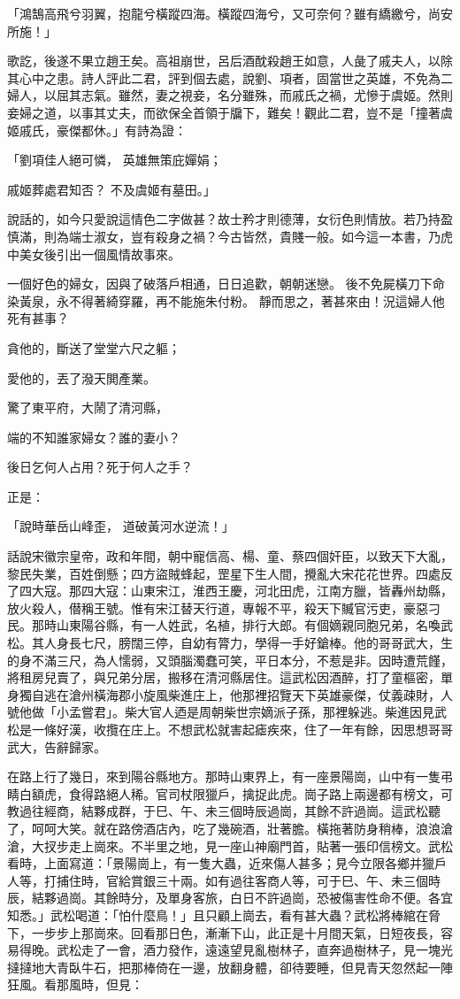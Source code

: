 「鴻鵠高飛兮羽翼，抱龍兮橫蹤四海。橫蹤四海兮，又可奈何？雖有繑繳兮，尚安所施！」

歌訖，後遂不果立趙王矣。高祖崩世，呂后酒酖殺趙王如意，人彘了戚夫人，以除其心中之患。詩人評此二君，評到個去處，說劉、項者，固當世之英雄，不免為二婦人，以屈其志氣。雖然，妻之視妾，名分雖殊，而戚氏之禍，尤慘于虞姬。然則妾婦之道，以事其丈夫，而欲保全首領于牖下，難矣！觀此二君，豈不是「撞著虞姬戚氏，豪傑都休。」有詩為證：

「劉項佳人絕可憐，  英雄無策庇嬋娟；

戚姬葬處君知否？  不及虞姬有墓田。」

說話的，如今只愛說這情色二字做甚？故士矜才則德薄，女衍色則情放。若乃持盈慎滿，則為端士淑女，豈有殺身之禍？今古皆然，貴賤一般。如今這一本書，乃虎中美女後引出一個風情故事來。

一個好色的婦女，因與了破落戶相通，日日追歡，朝朝迷戀。
後不免屍橫刀下命染黃泉，永不得著綺穿羅，再不能施朱付粉。
靜而思之，著甚來由！況這婦人他死有甚事？

貪他的，斷送了堂堂六尺之軀；

愛他的，丟了潑天閧產業。

驚了東平府，大鬧了清河縣，

端的不知誰家婦女？誰的妻小？

後日乞何人占用？死于何人之手？

正是：

「說時華岳山峰歪，  道破黃河水逆流！」

話說宋徽宗皇帝，政和年間，朝中寵信高、楊、童、蔡四個奸臣，以致天下大亂，黎民失業，百姓倒懸；四方盜賊蜂起，罡星下生人間，攪亂大宋花花世界。四處反了四大寇。那四大寇：山東宋江，淮西王慶，河北田虎，江南方臘，皆轟州劫縣，放火殺人，僣稱王號。惟有宋江替天行道，專報不平，殺天下贓官污吏，豪惡刁民。那時山東陽谷縣，有一人姓武，名植，排行大郎。有個嫡親同胞兄弟，名喚武松。其人身長七尺，膀闊三停，自幼有膂力，學得一手好鎗棒。他的哥哥武大，生的身不滿三尺，為人懦弱，又頭腦濁蠢可笑，平日本分，不惹是非。因時遭荒饉，將租房兒賣了，與兄弟分居，搬移在清河縣居住。這武松因酒醉，打了童樞密，單身獨自逃在滄州橫海郡小旋風柴進庄上，他那裡招覽天下英雄豪傑，仗義疎財，人號他做「小孟嘗君」。柴大官人迺是周朝柴世宗嫡派子孫，那裡躲逃。柴進因見武松是一條好漢，收攬在庄上。不想武松就害起瘧疾來，住了一年有餘，因思想哥哥武大，告辭歸家。

在路上行了幾日，來到陽谷縣地方。那時山東界上，有一座景陽崗，山中有一隻弔睛白額虎，食得路絕人稀。官司杖限獵戶，擒捉此虎。崗子路上兩邊都有榜文，可教過往經商，結夥成群，于巳、午、未三個時辰過崗，其餘不許過崗。這武松聽了，呵呵大笑。就在路傍酒店內，吃了幾碗酒，壯著膽。橫拖著防身稍棒，浪浪滄滄，大扠步走上崗來。不半里之地，見一座山神廟門首，貼著一張印信榜文。武松看時，上面寫道：「景陽崗上，有一隻大蟲，近來傷人甚多；見今立限各鄉并獵戶人等，打捕住時，官給賞銀三十兩。如有過往客商人等，可于巳、午、未三個時辰，結夥過崗。其餘時分，及單身客旅，白日不許過崗，恐被傷害性命不便。各宜知悉。」武松喝道：「怕什麼鳥！」且只顧上崗去，看有甚大蟲？武松將棒綰在脅下，一步步上那崗來。回看那日色，漸漸下山，此正是十月間天氣，日短夜長，容易得晚。武松走了一會，酒力發作，遠遠望見亂樹林子，直奔過樹林子，見一塊光撻撻地大青臥牛石，把那棒倚在一邊，放翻身體，卻待要睡，但見青天忽然起一陣狂風。看那風時，但見：

